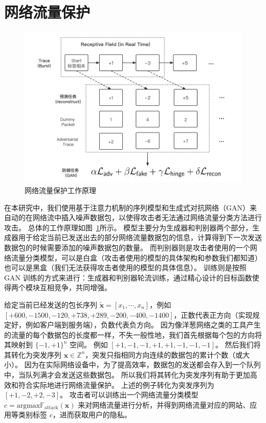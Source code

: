 \documentclass[degree=master,cjk-font=noto]{thuthesis}
\begin{document}
\section{网络流量保护}

\begin{figure}[!tp]
	\centerline{\includegraphics[width=12cm]{Practicable WF Defense.png}}
	\caption{网络流量保护工作原理}
	\label{fig:flow_defense}
\end{figure}

在本研究中，我们使用基于注意力机制的序列模型和生成式对抗网络（GAN）来自动的在网络流中插入噪声数据包，以使得攻击者无法通过网络流量分类方法进行攻击。
总体的工作原理如图~\ref{fig:flow_defense}所示。
模型主要分为生成器和判别器两个部分，生成器用于给定当前已发送出去的部分网络流量数据包的信息，计算得到下一次发送数据包的时候需要添加的噪声数据包的数量。
而判别器则是攻击者使用的一个网络流量分类模型，可以是白盒（攻击者使用的模型的具体架构和参数我们都知道）也可以是黑盒（我们无法获得攻击者使用的模型的具体信息）。
训练则是按照 GAN 训练的方式来进行：生成器和判别器轮流训练，通过精心设计的目标函数使得两个模块互相竞争，共同增强。

给定当前已经发送的包长序列 $\tilde{\boldsymbol{x}} = [x_1, \cdots, x_n]$，例如 $[+600, -1500, -120, +738, +289, -200, -400, -1400]$，正数代表正方向（实现规定好，例如客户端到服务端），负数代表负方向。
因为像洋葱网络之类的工具产生的流量的每个数据包的长度都一样，不失一般性地，我们首先根据每个包的方向将其映射到 $\{-1, +1\}^n$ 空间。
例如 $[+1, -1, -1, +1, +1, -1, -1, -1]$。
然后我们将其转化为突发序列 $\boldsymbol{x} \in \mathbb{Z}^n$，突发只指相同方向连续的数据包的累计个数（或大小）。
因为在实际网络设备中，为了提高效率，数据包的发送都会存入到一个队列中，当队列满才会发送这些数据包。
所以我们将其转化为突发序列有助于更加高效和符合实际地进行网络流量保护。
上述的例子转化为突发序列为 $[+1, -2, +2, -3]$。
攻击者可以训练出一个网络流量分类模型 $c = \text{argmax} \mathbb{F}_{\text{attack}} (\boldsymbol{x})$ 来对网络流量进行分析，并得到网络流量对应的网站、应用等类别标签 $c$，进而获取用户的隐私。
\end{document}

